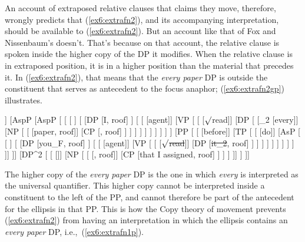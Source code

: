 An account of extraposed relative clauses that claims they move, therefore, wrongly predicts that (\ref{ex6:extrafn2}), and its accompanying interpretation, should be available to (\ref{ex6:extrafn2}). But an account like that of Fox and Nissenbaum's doesn't. That's because on that account, the relative clause is spoken inside the higher copy of the DP it modifies. When the relative clause is in extraposed position, it is in a higher position than the material that precedes it. In (\ref{ex6:extrafn2}), that means that the \emph{every paper} DP is outside the constituent that serves as antecedent to the focus anaphor; (\ref{ex6:extrafn2gp}) illustrates.
\medskip
\begin{fullwidth}
\begin{exe}
\raggedright
	\ex \label{ex6:extrafn2gp}
	\footnotesize
	\begin{forest}
	[TP [\ibar{T}
		[\obar{T} [must]]
		[AspP
			[AspP [
				[
				[ ]
				[
					[DP [I, roof] ]
					[
						[ [agent]]
						[VP [
							[ [$\surd$read]]
							[DP [
								[_2 [every]]
								[NP [
									[ [paper, roof]]
									[CP [, roof] ]
								] ]
							] ]
						] ]
					 ]
				 ]
			] 
			[PP [
				[ [before]]
				[TP [
					[ [do]]
					[AsP [
						[ ]
						[
							[DP [you_F, roof] ]
							[
								[ [agent]]
								[VP [
									[ [\sout{$\surd$read}]]
									[DP [\sout{it_2}, roof] ]
								] ]
							 ]
						 ]
					] ]
				] ]
			]]
			]]
			[DP^2 [
				[ []]
				[NP [
					[ [, roof]]
					[CP [that I assigned, roof] ]
				] ]
			]]
		 ]
	]]
	\end{forest}
\end{exe}
\end{fullwidth}
\medskip
The higher copy of the \emph{every paper} DP is the one in which \emph{every} is interpreted as the universal quantifier. This higher copy cannot be interpreted inside a constituent to the left of the PP, and cannot therefore be part of the antecedent for the ellipsis in that PP. This is how the Copy theory of movement prevents (\ref{ex6:extrafn2}) from having an interpretation in which the ellipsis contains an \emph{every paper} DP, i.e.,~(\ref{ex6:extrafn1p}).


